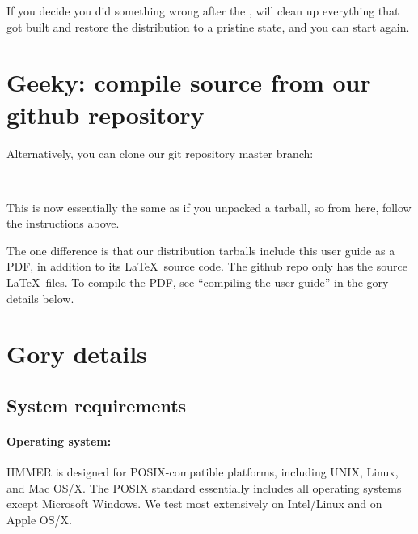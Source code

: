 If you decide you did something wrong after the ,
 will clean up everything that got built and
restore the distribution to a pristine state, and you can start again.


\section{Geeky: compile source from our github repository}

Alternatively, you can clone our git repository master
branch:
  
  \vspace{1ex}
   \\
  \vspace{1ex}

This is now essentially the same as if you unpacked a tarball, so from
here, follow the  instructions above.

The one difference is that our distribution tarballs include this user
guide as a PDF, in addition to its \LaTeX\ source code. The github
repo only has the source \LaTeX\ files. To compile the PDF, see
``compiling the user guide'' in the gory details below.


\section{Gory details}

\subsection{System requirements}

\paragraph{Operating system:} HMMER is designed for
POSIX-compatible platforms, including UNIX, Linux, and Mac OS/X. The
POSIX standard essentially includes all operating systems except
Microsoft Windows.  We test most extensively on Intel/Linux
and on Apple OS/X.

